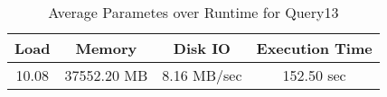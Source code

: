 \documentclass[../../main.tex]{subfiles}
\begin{document}
    \begin{table}
        \begin{center}
            \begin{tabular}{ |c|c|c|c| } 
            \hline
            Load & Memory & Disk IO & Execution Time\\
            \hline
            10.08 & 37552.20 MB & 8.16 MB/sec & 152.50 sec \\
            \hline
            \end{tabular}
            \\[1pt]
            \caption{Average Parametes over Runtime for Query13}
        \end{center}
    \end{table}
    \pagebreak
\end{document}
